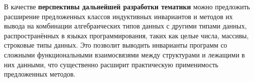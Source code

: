 В качестве \textbf{перспективы дальнейшей разработки тематики} можно предложить расширение предложенных классов индуктивных инвариантов и методов их вывода на комбинации алгебраических типов данных с другими типами данных, распространённых в языках программирования, таких как целые числа, массивы, строковые типы данных. Это позволит выводить инварианты программ со сложными функциональными взаимосвязями между структурами и лежащими в них данными, что существенно расширит практическую применимость предложенных методов.
